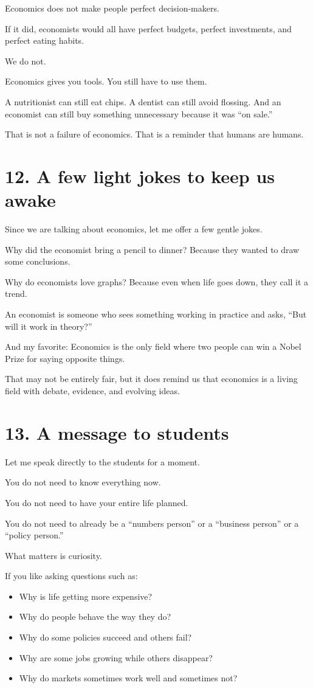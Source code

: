 \documentclass[12pt]{article}
\begin{document}
Economics does not make people perfect decision-makers.

If it did, economists would all have perfect budgets, perfect investments, and perfect eating habits.

We do not.

Economics gives you tools.  
You still have to use them.

A nutritionist can still eat chips.  
A dentist can still avoid flossing.  
And an economist can still buy something unnecessary because it was ``on sale.''

That is not a failure of economics.  
That is a reminder that humans are humans.

\section*{12. A few light jokes to keep us awake}

Since we are talking about economics, let me offer a few gentle jokes.

Why did the economist bring a pencil to dinner?  
Because they wanted to draw some conclusions.

Why do economists love graphs?  
Because even when life goes down, they call it a trend.

An economist is someone who sees something working in practice and asks, ``But will it work in theory?''

And my favorite:  
Economics is the only field where two people can win a Nobel Prize for saying opposite things.

That may not be entirely fair, but it does remind us that economics is a living field with debate, evidence, and evolving ideas.

\section*{13. A message to students}

Let me speak directly to the students for a moment.

You do not need to know everything now.

You do not need to have your entire life planned.

You do not need to already be a ``numbers person'' or a ``business person'' or a ``policy person.''

What matters is curiosity.

If you like asking questions such as:
\begin{itemize}[leftmargin=2em]
    \item Why is life getting more expensive?
    \item Why do people behave the way they do?
    \item Why do some policies succeed and others fail?
    \item Why are some jobs growing while others disappear?
    \item Why do markets sometimes work well and sometimes not?
\end{itemize}
\end{document}
